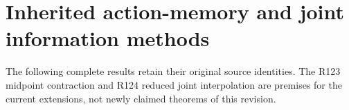 \documentclass[ecta,nameyear,draft]{econsocart}
\begin{document}















\section{Inherited action-memory and joint information methods}
The following complete results retain their original source identities.
The R123 midpoint contraction and R124 reduced joint interpolation are
premises for the current extensions, not newly claimed theorems of this revision.













\begingroup
\let\NBOBibliographyStart\thebibliography
\renewcommand{\thebibliography}[1]{\NBOBibliographyStart{#1}\raggedright}

\endgroup
\end{document}

